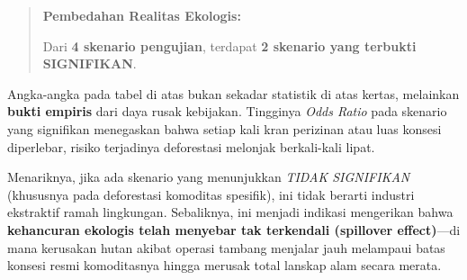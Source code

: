 \documentclass[
]{article}
\begin{document}
\begin{quote}
\textbf{Pembedahan Realitas Ekologis:}

Dari \textbf{4 skenario pengujian}, terdapat \textbf{2 skenario yang
terbukti SIGNIFIKAN}.
\end{quote}

Angka-angka pada tabel di atas bukan sekadar statistik di atas kertas,
melainkan \textbf{bukti empiris} dari daya rusak kebijakan. Tingginya
\emph{Odds Ratio} pada skenario yang signifikan menegaskan bahwa setiap
kali kran perizinan atau luas konsesi diperlebar, risiko terjadinya
deforestasi melonjak berkali-kali lipat.

Menariknya, jika ada skenario yang menunjukkan \emph{TIDAK SIGNIFIKAN}
(khususnya pada deforestasi komoditas spesifik), ini tidak berarti
industri ekstraktif ramah lingkungan. Sebaliknya, ini menjadi indikasi
mengerikan bahwa \textbf{kehancuran ekologis telah menyebar tak
terkendali (spillover effect)}---di mana kerusakan hutan akibat operasi
tambang menjalar jauh melampaui batas konsesi resmi komoditasnya hingga
merusak total lanskap alam secara merata.
\end{document}
